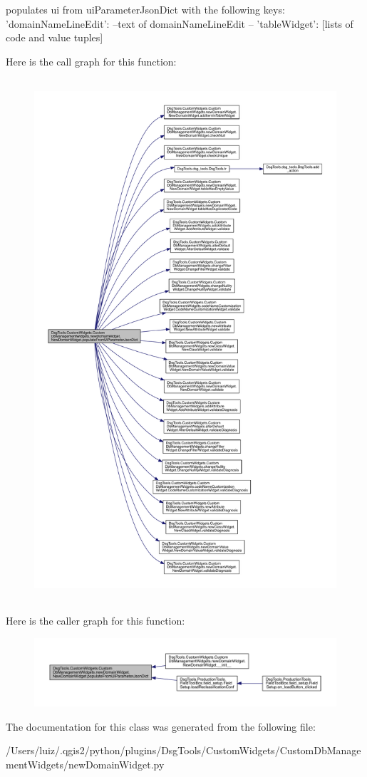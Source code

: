 \begin{DoxyVerb}populates ui from  uiParameterJsonDict with the following keys:
{
    'domainNameLineEdit': --text of domainNameLineEdit --
    'tableWidget': [lists of code and value tuples]
}
\end{DoxyVerb}
 Here is the call graph for this function\+:
\nopagebreak
\begin{figure}[H]
\begin{center}
\leavevmode
\includegraphics[height=550pt]{class_dsg_tools_1_1_custom_widgets_1_1_custom_db_management_widgets_1_1new_domain_widget_1_1_new_domain_widget_a79ada84e8570b7dd7bf7d3b7a33c3c0a_cgraph}
\end{center}
\end{figure}
Here is the caller graph for this function\+:
\nopagebreak
\begin{figure}[H]
\begin{center}
\leavevmode
\includegraphics[width=350pt]{class_dsg_tools_1_1_custom_widgets_1_1_custom_db_management_widgets_1_1new_domain_widget_1_1_new_domain_widget_a79ada84e8570b7dd7bf7d3b7a33c3c0a_icgraph}
\end{center}
\end{figure}


The documentation for this class was generated from the following file\+:\begin{DoxyCompactItemize}
\item 
/\+Users/luiz/.\+qgis2/python/plugins/\+Dsg\+Tools/\+Custom\+Widgets/\+Custom\+Db\+Management\+Widgets/new\+Domain\+Widget.\+py\end{DoxyCompactItemize}
